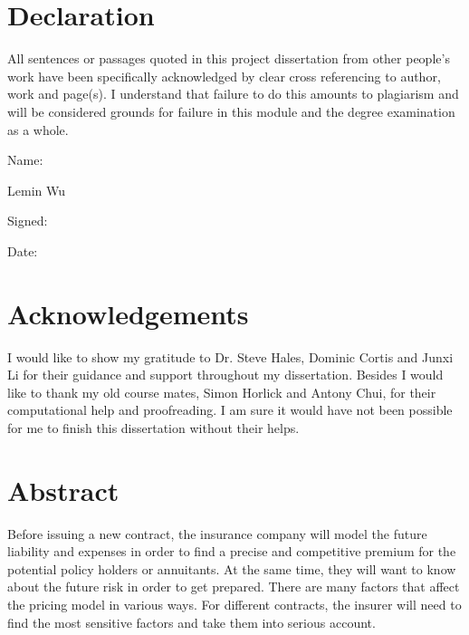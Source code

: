 \documentclass{report}
\begin{document}
\chapter*{Declaration}                %
All sentences or passages quoted in this project dissertation from other
people's work have been specifically acknowledged by clear cross referencing
to author, work and page(s).  I understand that failure to do this amounts
to plagiarism and will be considered grounds for failure in this module and
the degree examination as a whole.

\bigskip

\noindent
Name:

Lemin Wu\\


\bigskip

\noindent
Signed:


\bigskip

\noindent
Date:



\chapter*{Acknowledgements}


I would like to show my gratitude to Dr. Steve Hales, Dominic Cortis and Junxi Li for their guidance and support throughout my dissertation. Besides I would like to thank my old course mates, Simon Horlick and Antony Chui, for their computational help and proofreading.  I am sure it would have not been possible for me to finish this dissertation without their helps. 


\chapter*{Abstract}


Before issuing a new contract, the insurance company will model the future liability and expenses in order to find a precise and competitive premium for the potential policy holders or annuitants. At the same time, they will want to know about the future risk in order to get prepared. There are many factors that affect the pricing model in various ways. For different contracts, the insurer will need to find the most sensitive factors and take them into serious account. 
\end{document}
